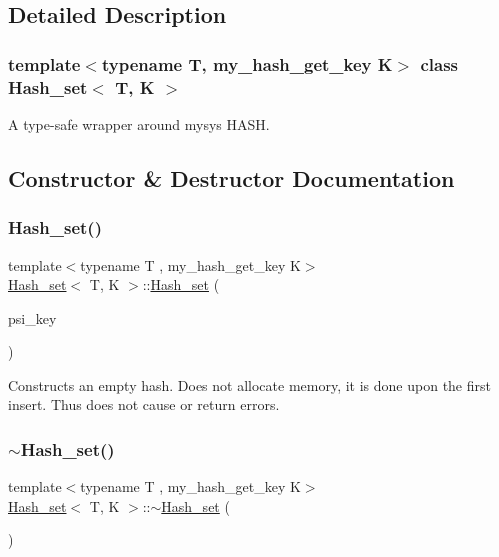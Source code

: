 \subsection{Detailed Description}
\subsubsection*{template$<$typename T, my\+\_\+hash\+\_\+get\+\_\+key K$>$\newline
class Hash\+\_\+set$<$ T, K $>$}

A type-\/safe wrapper around mysys H\+A\+SH. 

\subsection{Constructor \& Destructor Documentation}
\mbox{\label{classHash__set_a18dac5297ce6dca1a333aca94a3b5bf5}} 
\subsubsection{\texorpdfstring{Hash\+\_\+set()}{Hash\_set()}}
{\footnotesize\ttfamily template$<$typename T , my\+\_\+hash\+\_\+get\+\_\+key K$>$ \\
\mbox{\hyperlink{classHash__set}{Hash\+\_\+set}}$<$ T, K $>$\+::\mbox{\hyperlink{classHash__set}{Hash\+\_\+set}} (\begin{DoxyParamCaption}\item[{P\+S\+I\+\_\+memory\+\_\+key}]{psi\+\_\+key }\end{DoxyParamCaption})\hspace{0.3cm}{\ttfamily [inline]}}

Constructs an empty hash. Does not allocate memory, it is done upon the first insert. Thus does not cause or return errors. \mbox{\label{classHash__set_a8171c917e05408fae5e5a1b12d2b3011}} 
\subsubsection{\texorpdfstring{$\sim$\+Hash\+\_\+set()}{~Hash\_set()}}
{\footnotesize\ttfamily template$<$typename T , my\+\_\+hash\+\_\+get\+\_\+key K$>$ \\
\mbox{\hyperlink{classHash__set}{Hash\+\_\+set}}$<$ T, K $>$\+::$\sim$\mbox{\hyperlink{classHash__set}{Hash\+\_\+set}} (\begin{DoxyParamCaption}{ }\end{DoxyParamCaption})\hspace{0.3cm}{\ttfamily [inline]}}

